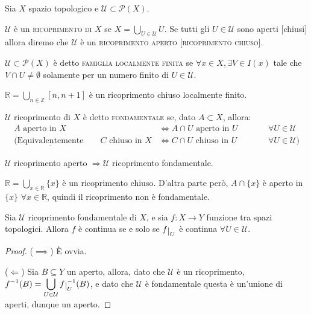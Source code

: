 Sia $X$ spazio topologico e $\mathcal{U} \subset \mathcal{P}(X)$.

\begin{defn}
$\mathcal{U}$ è un \textsc{ricoprimento di $X$} se $X=\bigcup _{U \in \mathcal{U}}U$. Se tutti gli $U \in \mathcal{U}$ sono aperti [chiusi] allora diremo che $\mathcal{U}$ è un \textsc{ricoprimento aperto [ricoprimento chiuso]}.
\end{defn}

\begin{defn}
$\mathcal{U} \subset \mathcal{P}(X)$ è detto \textsc{famiglia localmente finita} se $\forall x \in X, \exists V \in I(x)$ tale che $V \cap U \neq \emptyset$ solamente per un numero finito di $U \in \mathcal{U}$.
\end{defn}

\begin{ex}
$\mathbb{R}=\bigcup _{n \in \mathbb{Z}}[n,n+1]$ è un ricoprimento chiuso localmente finito.
\end{ex}

\begin{defn}
$\mathcal{U}$ ricoprimento di $X$ è detto \textsc{fondamentale} se, dato $A \subset X$, allora:
\begin{align*}
A \text{ aperto in }X &\Longleftrightarrow A \cap U \text{ aperto in }U \qquad &&\forall U \in \mathcal{U} \\
(\underline{\text{Equivalentemente}} \qquad C \text{ chiuso in }X &\Longleftrightarrow C \cap U \text{ chiuso in }U \qquad &&\forall U \in \mathcal{U})
\end{align*}
\end{defn}

\begin{ex}
\begin{nlist}
\item $\mathcal{U}$ ricoprimento aperto $\Longrightarrow \mathcal{U}$ ricoprimento fondamentale.
\item $\mathbb{R}=\bigcup _{x \in \mathbb{R}} \{x\}$ è un ricoprimento chiuso. D'altra parte però, $A \cap \{x\}$ è aperto in $\{x\}$ $\forall x \in \mathbb{R}$, quindi il ricoprimento non è fondamentale.
\end{nlist}
\end{ex}

\begin{prop}
Sia $\mathcal{U}$ ricoprimento fondamentale di $X$, e sia $f:X \longrightarrow Y$ funzione tra spazi topologici. Allora $f$ è continua se e solo se $f \restrict {U}$ è continua $\forall U \in \mathcal{U}$.
\end{prop}
\begin{proof}
  ($\implies$) È ovvia.

  ($\Leftarrow$) Sia $B \subseteq Y$ un aperto, allora, dato che $\mathcal{U}$ è un ricoprimento, $\displaystyle f^{-1}(B)=\bigcup_{U \in \mathcal{U}} f\restrict{U}^{-1}(B)$, e dato che $\mathcal{U}$ è fondamentale questa è un'unione di aperti, dunque un aperto.
\end{proof}

